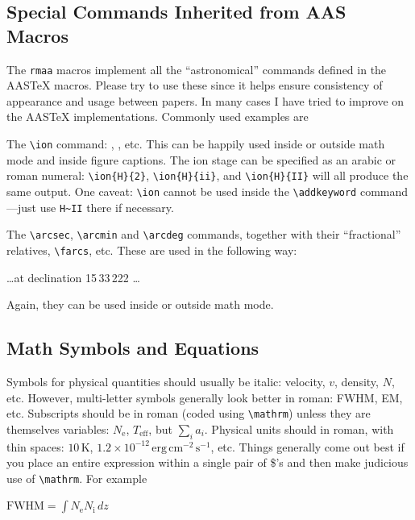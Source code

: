 \documentclass[proceedings, preprint]{rmaa}
\newcommand{\CS}[1]{\texttt{\textbackslash #1}}
\newenvironment{Example}
{\begin{list}{}{\setlength{\leftmargin}{5pt}\setlength{\rightmargin}{5pt}}\item[]}
  {\end{list}}
\begin{document}
\subsection{Special Commands Inherited from AAS Macros}
\label{sec:command}

The \texttt{rmaa} macros implement all the ``astronomical'' commands
defined in the AAS\TeX{} macros. Please try to use these since it
helps ensure consistency of appearance and usage between papers. In
many cases I have tried to improve on the AAS\TeX{}
implementations. Commonly used examples are 
\begin{asparaitem}
\item The \CS{ion} command: , , etc. This can
  be happily used inside or outside math mode and inside figure
  captions. The ion stage can be specified as an arabic or roman
  numeral: \verb+\ion{H}{2}+, \verb+\ion{H}{ii}+, and
  \verb+\ion{H}{II}+ will all produce the same output. One caveat:
  \CS{ion} cannot be used inside the \CS{addkeyword} command---just
  use \verb+H~II+ there if necessary.
\item The \CS{arcsec}, \CS{arcmin} and \CS{arcdeg} commands, together
  with their ``fractional'' relatives, \CS{farcs}, etc. These are used
  in the following way: 
  \begin{Example}
    \dots at declination 15\arcdeg\,33\arcmin\,22\farcs{}2 \dots
  \end{Example}
  Again, they can be used inside or outside math mode. 
\end{asparaitem}


\subsection{Math Symbols and Equations}
\label{sec:math}

Symbols for physical quantities should usually be italic: velocity,
$v$, density, $N$, etc. However, multi-letter symbols generally look
better in roman: FWHM, EM, etc. Subscripts should be in roman (coded
using \CS{mathrm}) unless they are themselves variables:
$N_\mathrm{e}$, $T_\mathrm{eff}$, but $\sum_i a_i$. Physical units
should in roman, with thin spaces: $10\,\mathrm{K}$, $1.2\times
10^{-12} \,\mathrm{erg\,cm^{-2}\,s^{-1}}$, etc. Things generally come
out best if you place an entire expression within a single pair of
\$'s and then make judicious use of \CS{mathrm}. For example
\begin{Example}
  $ \mathrm{FWHM} = \int N_\mathrm{e} N_\mathrm{i} \, dz $ 
\end{Example}
\end{document}
